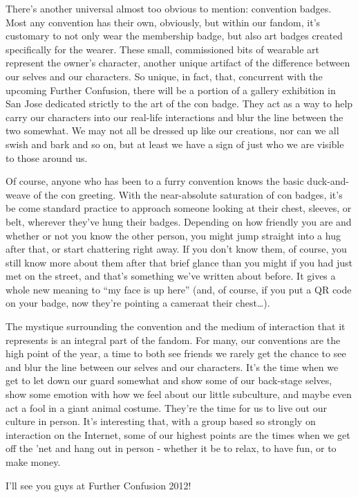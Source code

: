 There's another universal almost too obvious to mention: convention badges. Most any convention has their own, obviously, but within our fandom, it's customary to not only wear the membership badge, but also art badges created specifically for the wearer. These small, commissioned bits of wearable art represent the owner's character, another unique artifact of the difference between our selves and our characters. So unique, in fact, that, concurrent with the upcoming Further Confusion, there will be a portion of a gallery exhibition in San Jose dedicated strictly to the art of the con badge. They act as a way to help carry our characters into our real-life interactions and blur the line between the two somewhat. We may not all be dressed up like our creations, nor can we all swish and bark and so on, but at least we have a sign of just who we are visible to those around us.

Of course, anyone who has been to a furry convention knows the basic duck-and-weave of the con greeting. With the near-absolute saturation of con badges, it's be come standard practice to approach someone looking at their chest, sleeves, or belt, wherever they've hung their badges. Depending on how friendly you are and whether or not you know the other person, you might jump straight into a hug after that, or start chattering right away. If you don't know them, of course, you still know more about them after that brief glance than you might if you had just met on the street, and that's something we've written about before. It gives a whole new meaning to ``my face is up here'' (and, of course, if you put a QR code on your badge, now they're pointing a cameraat their chest\ldots{}).

The mystique surrounding the convention and the medium of interaction that it represents is an integral part of the fandom. For many, our conventions are the high point of the year, a time to both see friends we rarely get the chance to see and blur the line between our selves and our characters. It's the time when we get to let down our guard somewhat and show some of our back-stage selves, show some emotion with how we feel about our little subculture, and maybe even act a fool in a giant animal costume. They're the time for us to live out our culture in person. It's interesting that, with a group based so strongly on interaction on the Internet, some of our highest points are the times when we get off the 'net and hang out in person - whether it be to relax, to have fun, or to make money.

I'll see you guys at Further Confusion 2012!
